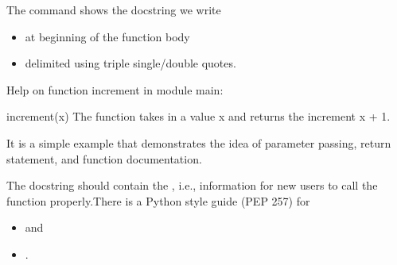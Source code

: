 \documentclass[letterpaper,10pt,english]{sphinxmanual}
\begin{document}
\begin{sphinxVerbatim}[commandchars=\\\{\}]
 
         
\end{sphinxVerbatim}

The  command shows the docstring we write
\begin{itemize}
\item {} 
at beginning of the function body

\item {} 
delimited using triple single/double quotes.

\end{itemize}

\begin{sphinxVerbatim}[commandchars=\\\{\}]
\end{sphinxVerbatim}

\begin{sphinxVerbatim}[commandchars=\\\{\}]
Help on function increment in module \PYGZus{}\PYGZus{}main\PYGZus{}\PYGZus{}:

increment(x)
    The function takes in a value x and returns the increment x + 1.
    
    It is a simple example that demonstrates the idea of
    \PYGZhy{} parameter passing, 
    \PYGZhy{} return statement, and 
    \PYGZhy{} function documentation.
\end{sphinxVerbatim}

The docstring should contain the , i.e., information for new users to call the function properly.There is a Python style guide (PEP 257) for
\begin{itemize}
\item {} 
 and

\item {} 
.

\end{itemize}
\end{document}
